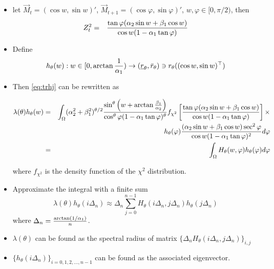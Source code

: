 \documentclass{beamer}
\begin{document}
\begin{frame}
  \begin{itemize}
    \item let $\vec M_t = (\cos w, \sin w)'$,
    $\vec M_{t+1} = (\cos\varphi, \sin\varphi)'$,
    $w, \varphi \in [0, \pi/2)$, then
    \begin{eqnarray*}
      Z_t^2 &=&
      {\tan\varphi (\alpha_2 \sin w + \beta_1 \cos w)
        \over
        \cos w (1- \alpha_1 \tan\varphi)
      }
    \end{eqnarray*}
  \item Define
    \[
    h_\theta(w): w \in [0, \arctan{1 \over \alpha_1}) \to (\underline r_\theta, \bar r_\theta)
    \ni r_\theta((\cos w, \sin w)^\top)
    \]
  \item Then \eqref{eq:trhj} can be rewritten as
    \begin{tiny}
      \begin{eqnarray}
        \lambda(\theta) h_\theta(w)
        &=&
        \int_\Omega (\alpha_2^2 + \beta_1^2)^{\theta/2} {
          \sin^\theta\left(
            w + \arctan{\beta_1 \over \alpha_2}
          \right)
          \over
          \cos^\theta\varphi (1 - \alpha_1 \tan\varphi)^\theta
        }
        f_{\chi^2}\left[
          {\tan\varphi (\alpha_2 \sin w + \beta_1 \cos w)
            \over
            \cos w (1- \alpha_1 \tan\varphi)
          } \right] \times \nonumber\\
        &&
        h_\theta(\varphi)
        {
          (\alpha_2 \sin w + \beta_1 \cos w) \sec^2\varphi
          \over
          \cos w (1 - \alpha_1 \tan\varphi)^2
        }
        d\varphi \nonumber \\
        &=&
        \int_\Omega H_\theta(w, \varphi) h_\theta(\varphi) d\varphi
      \end{eqnarray}
    \end{tiny}
    where $f_{\chi^2}$ is the density function of the $\chi^2$ distribution.
  \end{itemize}
\end{frame}

\begin{frame}
  \begin{itemize}
  \item Approximate the integral with a finite sum
    \[
    \lambda(\theta) h_\theta(i \Delta_n)
    \approx
    \Delta_n \sum_{j=0}^{n-1} H_\theta(i \Delta_n, j \Delta_n) h_\theta(j \Delta_n)
    \]
    where $\Delta_n = {\arctan(1/\alpha_1) \over n}$.
  \item $\lambda(\theta)$ can be found as the spectral radius of 
    matrix $\{\Delta_n H_\theta(i \Delta_n, j \Delta_n)\}_{i,j}$
  \item $\{h_\theta(i \Delta_n)\}_ {i=0,1,2,\dots, n-1}$ can be found as
    the associated eigenvector.
  \end{itemize}
\end{frame}
\end{document}
